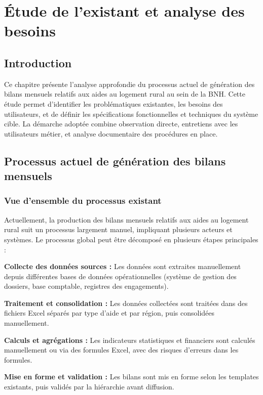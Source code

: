 \chapter{Étude de l'existant et analyse des besoins}
\clearpage
\label{chap:existant-besoins}

\section{Introduction}

Ce chapitre présente l'analyse approfondie du processus actuel de génération des bilans mensuels relatifs aux aides au logement rural au sein de la BNH. Cette étude permet d'identifier les problématiques existantes, les besoins des utilisateurs, et de définir les spécifications fonctionnelles et techniques du système cible. La démarche adoptée combine observation directe, entretiens avec les utilisateurs métier, et analyse documentaire des procédures en place.

\section{Processus actuel de génération des bilans mensuels}

\subsection{Vue d'ensemble du processus existant}

Actuellement, la production des bilans mensuels relatifs aux aides au logement rural suit un processus largement manuel, impliquant plusieurs acteurs et systèmes. Le processus global peut être décomposé en plusieurs étapes principales :

\medskip

\textbf{Collecte des données sources :} Les données sont extraites manuellement depuis différentes bases de données opérationnelles (système de gestion des dossiers, base comptable, registres des engagements).

\textbf{Traitement et consolidation :} Les données collectées sont traitées dans des fichiers Excel séparés par type d'aide et par région, puis consolidées manuellement.

\textbf{Calculs et agrégations :} Les indicateurs statistiques et financiers sont calculés manuellement ou via des formules Excel, avec des risques d'erreurs dans les formules.

\textbf{Mise en forme et validation :} Les bilans sont mis en forme selon les templates existants, puis validés par la hiérarchie avant diffusion.

